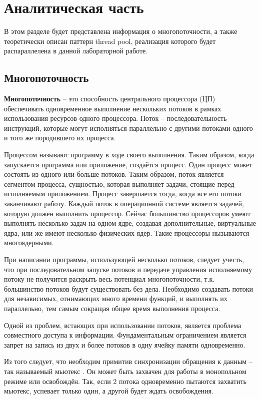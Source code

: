 \chapter{Аналитическая часть}
В этом разделе будет представлена информация о многопоточности, а также теоретически описан паттерн thread pool, реализация которого будет распараллелена в данной лабораторной работе. 

\section{Многопоточность}
\textbf{Многопоточность} \cite{multithreading} -- это способность центрального процессора (ЦП) обеспечивать одновременное выполнение нескольких потоков в рамках использования ресурсов одного процессора. Поток -- последовательность инструкций, которые могут исполняться параллельно с другими потоками одного и того же породившего их процесса.

Процессом \cite{process} называют программу в ходе своего выполнения. Таким образом, когда запускается программа или приложение, создаётся процесс. Один процесс может состоять из одного или больше потоков.
Таким образом, поток является сегментом процесса, сущностью, которая выполняет задачи, стоящие перед исполняемым приложением. 
Процесс завершается тогда, когда все его потоки заканчивают работу.
Каждый поток в операционной системе является задачей, которую должен выполнить процессор. Сейчас большинство процессоров умеют выполнять несколько задач на одном ядре, создавая дополнительные, виртуальные ядра, или же имеют несколько физических ядер. Такие процессоры нызываются многоядерными. 

При написании программы, использующей несколько потоков, следует учесть, что при последовательном запуске потоков и передаче управления исполняемому потоку не получится раскрыть весь потенциал многопоточности, т.к. большинство потоков будут существовать без дела.
Необходимо создавать потоки для независимых, отнимающих много времени функций, и выполнять их параллельно, тем самым сокращая общее время выполнения процесса.


Одной из проблем, встающих при использовании потоков, является проблема совместного доступа к информации. Фундаментальным ограничением является запрет на запись из двух и более потоков в одну ячейку памяти одновременно.

Из того следует, что необходим примитив синхронизации обращения к данным -- так называемый мьютекс . 
Он может быть захвачен для работы в монопольном режиме или освобождён. 
Так, если 2 потока одновременно пытаются захватить мьютекс, успевает только один, а другой будет ждать освобождения. 

